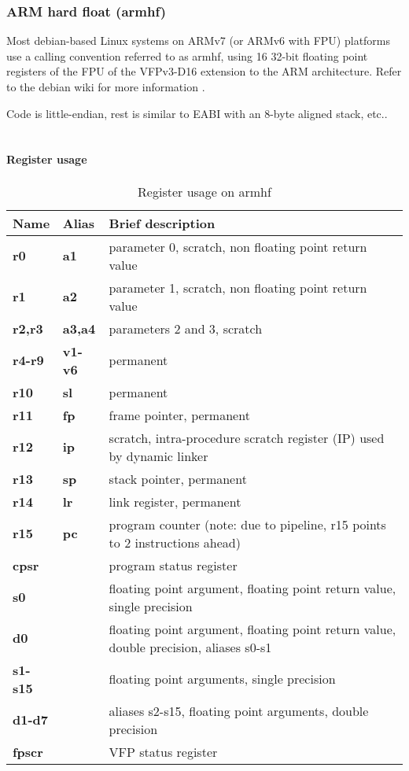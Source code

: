 \newpage


\subsubsection{ARM hard float (armhf)}


Most debian-based Linux systems on ARMv7 (or ARMv6 with FPU) platforms use a calling convention referred to
as armhf, using 16 32-bit floating point registers of the FPU of the VFPv3-D16 extension to the ARM architecture.
Refer to the debian wiki for more information \cite{armhf}. %

Code is little-endian, rest is similar to EABI with an 8-byte aligned stack, etc..\\
\\
\paragraph{Register usage}

\begin{table}[h]
\begin{tabular*}{0.95\textwidth}{lll}
Name         & Alias       &  Brief description\\
\hline          
{\bf r0}     & {\bf a1}    &  parameter 0, scratch, non floating point return value\\
{\bf r1}     & {\bf a2}    &  parameter 1, scratch, non floating point return value\\
{\bf r2,r3}  & {\bf a3,a4} &  parameters 2 and 3, scratch\\
{\bf r4-r9}  & {\bf v1-v6} &  permanent\\
{\bf r10}    & {\bf sl}    &  permanent\\
{\bf r11}    & {\bf fp}    &  frame pointer, permanent\\
{\bf r12}    & {\bf ip}    &  scratch, intra-procedure scratch register (IP) used by dynamic linker\\
{\bf r13}    & {\bf sp}    &  stack pointer, permanent\\
{\bf r14}    & {\bf lr}    &  link register, permanent\\
{\bf r15}    & {\bf pc}    &  program counter (note: due to pipeline, r15 points to 2 instructions ahead)\\
{\bf cpsr}   &             &  program status register\\
{\bf s0}     &             &  floating point argument, floating point return value, single precision\\
{\bf d0}     &             &  floating point argument, floating point return value, double precision, aliases s0-s1\\
{\bf s1-s15} &             &  floating point arguments, single precision\\
{\bf d1-d7}  &             &  aliases s2-s15, floating point arguments, double precision\\
{\bf fpscr}  &             &  VFP status register\\
\end{tabular*}
\caption{Register usage on armhf}
\end{table}

